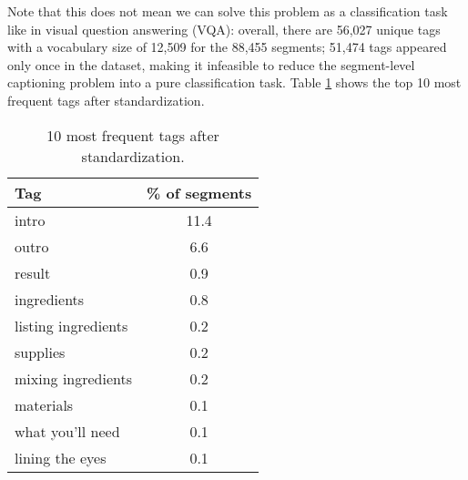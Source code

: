 \documentclass[11pt,a4paper]{article}
\begin{document}
Note that this does not mean we can solve this problem as a classification task like in visual question answering (VQA):
overall, there are 56,027 unique tags with a vocabulary size of 12,509 for the 88,455 segments; 51,474 tags appeared only once in the dataset, making it infeasible to reduce the segment-level captioning problem into a pure classification task.  Table \ref{tab:top10_tags} shows the top 10 most frequent tags after standardization.

\begin{table}[]
    \centering
    \begin{tabular}{l|c} \hline
Tag & \% of segments \\ \hline
intro & 11.4 \\
outro & 6.6 \\
result & 0.9 \\
ingredients & 0.8 \\
listing ingredients & 0.2 \\
supplies & 0.2 \\
mixing ingredients & 0.2 \\
materials & 0.1 \\
what you'll need & 0.1 \\
lining the eyes & 0.1 \\    \hline
    \end{tabular}
    \caption{10 most frequent tags after standardization.}
    \label{tab:top10_tags}
\end{table}
\end{document}
